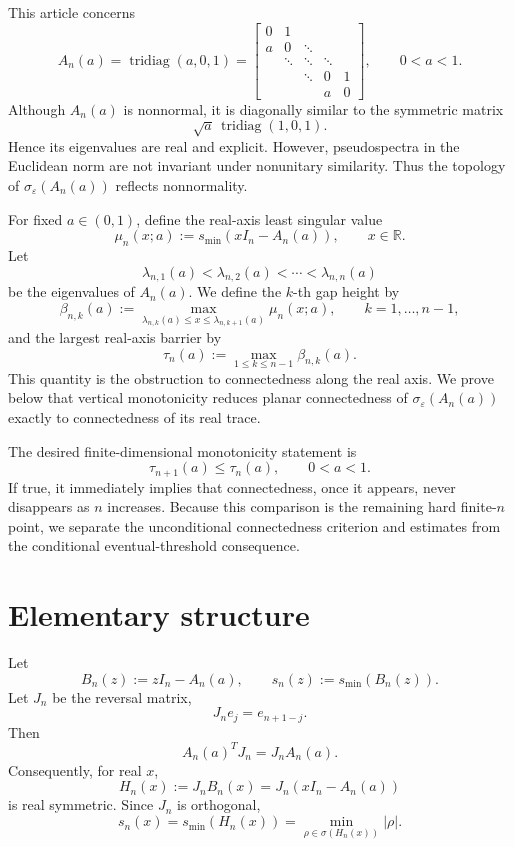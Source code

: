 \documentclass[11pt]{amsart}
\numberwithin{equation}{section}
\DeclareMathOperator{\tridiag}{tridiag}
\newcommand{\R}{\mathbb R}
\newcommand{\eps}{\varepsilon}
\begin{document}
This article concerns
\[
A_n(a)
=
\tridiag(a,0,1)
=
\begin{bmatrix}
0 & 1 \\
a & 0 & \ddots \\
& \ddots & \ddots & \ddots \\
&& \ddots & 0 & 1 \\
&&& a & 0
\end{bmatrix},
\qquad 0<a<1.
\]
Although \(A_n(a)\) is nonnormal, it is diagonally similar to the symmetric matrix
\[
\sqrt a\,\tridiag(1,0,1).
\]
Hence its eigenvalues are real and explicit.  However, pseudospectra in the Euclidean norm are not invariant under nonunitary similarity.  Thus the topology of \(\sigma_\eps(A_n(a))\) reflects nonnormality.

For fixed \(a\in(0,1)\), define the real-axis least singular value
\[
\mu_n(x;a):=s_{\min}(xI_n-A_n(a)),
\qquad x\in\R.
\]
Let
\[
\lambda_{n,1}(a)<\lambda_{n,2}(a)<\cdots<\lambda_{n,n}(a)
\]
be the eigenvalues of \(A_n(a)\).  We define the \(k\)-th gap height by
\[
\beta_{n,k}(a)
:=
\max_{\lambda_{n,k}(a)\le x\le\lambda_{n,k+1}(a)}
\mu_n(x;a),
\qquad k=1,\dots,n-1,
\]
and the largest real-axis barrier by
\[
\tau_n(a):=\max_{1\le k\le n-1}\beta_{n,k}(a).
\]
This quantity is the obstruction to connectedness along the real axis.  We prove below that vertical monotonicity reduces planar connectedness of \(\sigma_\eps(A_n(a))\) exactly to connectedness of its real trace.

The desired finite-dimensional monotonicity statement is
\[
\tau_{n+1}(a)\le\tau_n(a),
\qquad 0<a<1.
\]
If true, it immediately implies that connectedness, once it appears, never disappears as \(n\) increases.  Because this comparison is the remaining hard finite-\(n\) point, we separate the unconditional connectedness criterion and estimates from the conditional eventual-threshold consequence.

\section{Elementary structure}

Let
\[
B_n(z):=zI_n-A_n(a),
\qquad
s_n(z):=s_{\min}(B_n(z)).
\]
Let \(J_n\) be the reversal matrix,
\[
J_ne_j=e_{n+1-j}.
\]
Then
\[
A_n(a)^TJ_n=J_nA_n(a).
\]
Consequently, for real \(x\),
\[
H_n(x):=J_nB_n(x)=J_n(xI_n-A_n(a))
\]
is real symmetric.  Since \(J_n\) is orthogonal,
\begin{equation}\label{eq:real-axis-smin}
s_n(x)
=
s_{\min}(H_n(x))
=
\min_{\rho\in\sigma(H_n(x))}|\rho|.
\end{equation}
\end{document}
